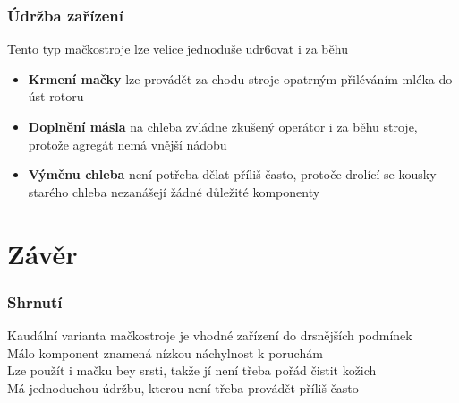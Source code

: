 \documentclass{beamer}
\newcommand{\mypause}{\pause}
\begin{document}
\begin{frame}
    \frametitle{Údržba zařízení}
    Tento typ mačkostroje lze velice jednoduše udr6ovat i za běhu
    \begin{itemize}
        \item \textbf{Krmení mačky}  lze provádět za chodu stroje opatrným přiléváním mléka do úst rotoru
        \mypause
        \item \textbf{Doplnění másla}  na chleba zvládne zkušený operátor i za běhu stroje, protože agregát nemá vnější nádobu
        \mypause
        \item \textbf{Výměnu chleba}  není potřeba dělat příliš často, protoče drolící se kousky starého chleba nezanášejí žádné důležité komponenty
    \end{itemize}
\end{frame}

\section{Závěr}
\begin{frame}
    \frametitle{Shrnutí}
    \mypause
    Kaudální varianta mačkostroje je vhodné zařízení do drsnějších podmínek
    \\ \vspace*{5pt} \mypause 
    Málo komponent znamená nízkou náchylnost k poruchám
    \\ \vspace*{5pt} \mypause 
    Lze použít i mačku bey srsti, takže jí není třeba pořád čistit kožich
    \\ \vspace*{5pt} \mypause 
    Má jednoduchou údržbu, kterou není třeba provádět příliš často
\end{frame}
\end{document}
